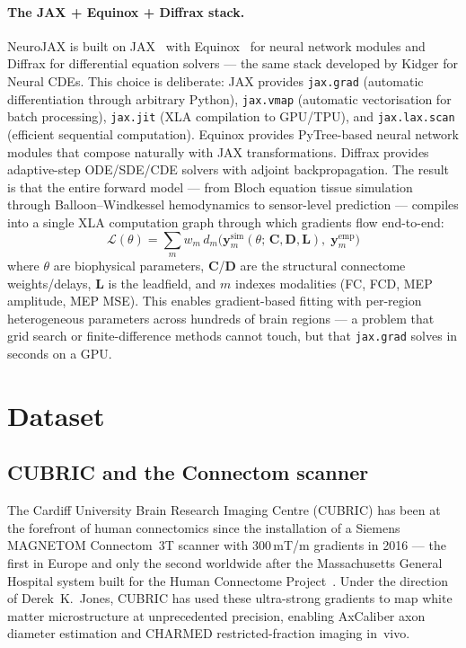 \documentclass[11pt,a4paper]{article}\usepackage[]{graphicx}\usepackage[]{xcolor}
\begin{document}
\paragraph{The JAX + Equinox + Diffrax stack.}
NeuroJAX is built on JAX~\citep{Bradbury2018jax} with
Equinox~\citep{Kidger2021equinox} for neural network modules and
Diffrax for differential equation solvers --- the same stack developed
by Kidger for Neural CDEs. This choice is deliberate: JAX provides
\texttt{jax.grad} (automatic differentiation through arbitrary Python),
\texttt{jax.vmap} (automatic vectorisation for batch processing),
\texttt{jax.jit} (XLA compilation to GPU/TPU), and
\texttt{jax.lax.scan} (efficient sequential computation). Equinox
provides PyTree-based neural network modules that compose naturally
with JAX transformations. Diffrax provides adaptive-step ODE/SDE/CDE
solvers with adjoint backpropagation. The result is that the entire
forward model --- from Bloch equation tissue simulation through
Balloon--Windkessel hemodynamics to sensor-level prediction --- compiles
into a single XLA computation graph through which gradients flow
end-to-end:
%
\begin{equation}
  \mathcal{L}(\theta) = \sum_m w_m \, d_m\!\bigl(
    \mathbf{y}_m^{\text{sim}}(\theta;\, \mathbf{C},\mathbf{D},\mathbf{L}),\;
    \mathbf{y}_m^{\text{emp}}
  \bigr)
\end{equation}
%
where $\theta$ are biophysical parameters, $\mathbf{C}$/$\mathbf{D}$ are
the structural connectome weights/delays, $\mathbf{L}$ is the leadfield,
and $m$ indexes modalities (FC, FCD, MEP amplitude, MEP MSE). This
enables gradient-based fitting with per-region heterogeneous parameters
across hundreds of brain regions --- a problem that grid search or
finite-difference methods cannot touch, but that
\texttt{jax.grad} solves in seconds on a GPU.

\section{Dataset}

\subsection{CUBRIC and the Connectom scanner}

The Cardiff University Brain Research Imaging Centre (CUBRIC) has been
at the forefront of human connectomics since the installation of a
Siemens MAGNETOM Connectom~3T scanner with 300\,mT/m gradients in
2016 --- the first in Europe and only the second worldwide after the
Massachusetts General Hospital system built for the Human Connectome
Project~\citep{Jones2022connectom}. Under the direction of
Derek~K.~Jones, CUBRIC has used these ultra-strong gradients to map
white matter microstructure at unprecedented precision, enabling
AxCaliber axon diameter estimation and CHARMED restricted-fraction
imaging in~vivo.
\end{document}
